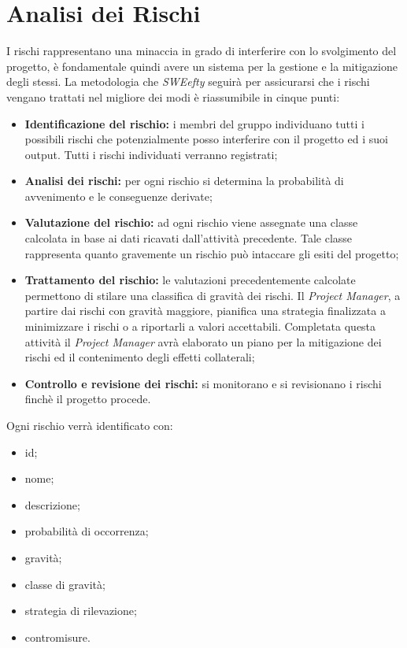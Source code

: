 \section{Analisi dei Rischi}
I rischi rappresentano una minaccia in grado di interferire con lo svolgimento del progetto, è fondamentale quindi avere un sistema per la gestione e la mitigazione degli stessi.
La metodologia che \textit{SWEefty} seguirà per assicurarsi che i rischi vengano trattati nel migliore dei modi è riassumibile in cinque punti:
\begin{itemize}
	\item \textbf{Identificazione del rischio:} i membri del gruppo individuano tutti i possibili rischi che potenzialmente posso interferire con il progetto ed i suoi output. Tutti i rischi individuati verranno registrati;
	
	\item \textbf{Analisi dei rischi:} per ogni rischio si determina la probabilità di avvenimento e le conseguenze derivate;
	
	\item \textbf{Valutazione del rischio:} ad ogni rischio viene assegnate una classe calcolata in base ai dati ricavati dall'attività precedente. Tale classe rappresenta quanto gravemente un rischio può intaccare gli esiti del progetto;
	
	\item \textbf{Trattamento del rischio:} le valutazioni precedentemente calcolate permettono di stilare una classifica di gravità dei rischi. Il \emph{Project Manager}, a partire dai rischi con gravità maggiore, pianifica una strategia finalizzata a minimizzare i rischi o a riportarli a valori accettabili. Completata questa attività il \emph{Project Manager} avrà elaborato un piano per la mitigazione dei rischi ed il contenimento degli effetti collaterali;
	
	\item \textbf{Controllo e revisione dei rischi:} si monitorano e si revisionano i rischi finchè il progetto procede.
\end{itemize}

Ogni rischio verrà identificato con:
\begin{itemize}
	\item id;
	\item nome;
	\item descrizione;
	\item probabilità di occorrenza;
	\item gravità;
	\item classe di gravità;
	\item strategia di rilevazione;
	\item contromisure.
\end{itemize}

